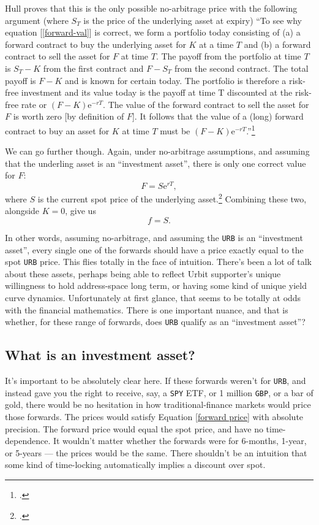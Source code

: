 \documentclass{article}
\begin{document}
	Hull proves that this is the only possible no-arbitrage price with the following argument (where $S_T$ is the price of the underlying asset at expiry) ``To see why equation [\ref{forward-val}] is correct, we form a portfolio today consisting of (a) a forward contract to buy the underlying asset for $K$ at a time $T$ and (b) a forward contract to sell the asset for $F$ at time $T$. The payoff from the portfolio at time $T$ is $S_T - K$ from the first contract and $F - S_T$ from the second contract. The total payoff is $F - K$ and is known for certain today. The portfolio is therefore a risk-free investment and its value today is the payoff at time T discounted at the risk-free rate or $(F - K)\mathrm{e}^{-rT}$. The value of the forward contract to sell the asset for $F$ is worth zero [by definition of $F$]. It follows that the value of a (long) forward contract to buy an asset for $K$ at time $T$ must be $(F - K)\mathrm{e}^{-rT}$.''\footcite[133]{hull}
	
	We can go further though. Again, under no-arbitrage assumptions, and assuming that the underling asset is an ``investment asset'', there is only one correct value for $F$:
	\begin{equation}
		F = S\mathrm{e}^{rT},
	\end{equation}
	where $S$ is the current spot price of the underlying asset.\footcite[127]{hull} Combining these two, alongside $K=0$, give us
	\begin{equation}
		\label{forward price}
		f = S.
	\end{equation}
	
	In other words, assuming no-arbitrage, and assuming the \texttt{URB} is an ``investment asset'', every single one of the forwards should have a price exactly equal to the spot \texttt{URB} price. This flies totally in the face of intuition. There's been a lot of talk about these assets, perhaps being able to reflect Urbit supporter's unique willingness to hold address-space long term, or having some kind of unique yield curve dynamics. Unfortunately at first glance, that seems to be totally at odds with the financial mathematics.  There is one important nuance, and that is whether, for these range of forwards, does \texttt{URB} qualify as an ``investment asset''?
	
	\subsection{What is an investment asset?}
	It's important to be absolutely clear here. If these forwards weren't for \texttt{URB}, and instead gave you the right to receive, say, a \texttt{SPY} ETF, or 1 million \texttt{GBP}, or a bar of gold, there would be no hesitation in how traditional-finance markets would price those forwards. The prices would satisfy Equation \ref{forward price} with absolute precision. The forward price would equal the spot price, and have no time-dependence. It wouldn't matter whether the forwards were for 6-months, 1-year, or 5-years --- the prices would be the same. There shouldn't be an intuition that some kind of time-locking automatically implies a discount over spot. 
	
\end{document}
